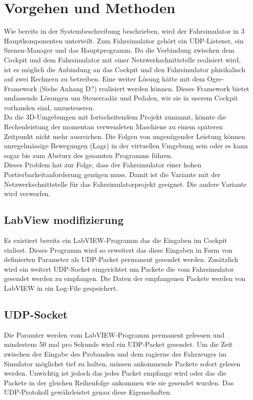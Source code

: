 \section{Vorgehen und Methoden}
Wie bereits in der Systembeschreibung beschrieben, wird der Fahrsimulator in 3 Hauptkomponenten unterteilt. Zum Fahrsimulator gehört ein UDP-Listener, ein Szenen-Manager und das Hauptprogramm. Da die Verbindung zwischen dem Cockpit und dem Fahrsimulator mit einer Netzwerkschnittstelle realisiert wird, ist es möglich die Anbindung an das Cockpit und den Fahrsimulator phisikalisch auf zwei Rechnern zu betreiben. Eine weiter Lösung hätte mit dem Ogre-Framework (Siehe Anhang D?) realisiert werden können. Dieses Framework bietet umfassende Lösungen um Steuerradär und Pedalen, wie sie in userem Cockpit vorhanden sind, anzusteueren.\\
Da die 3D-Umgebungen mit fortscheitendem Projekt zunimmt, könnte die Rechenleistung der momentan verwendeten Maschiene zu einem späteren Zeitpunkt nicht mehr ausreichen. Die Folgen von ungenügender Leistung können unregelmässige Bewegungen (Lags) in der virtuellen Umgebung sein oder es kann sogar bis zum Absturz des gesamten Programms führen. \\
Dieses Problem hat zur Folge, dass der Fahrsimulator einer hohen Portierbarkeitanforderung genügen muss. Damit ist die Variante mit der Netzwerkschnittstelle für das Fahrsimulatorprojekt geeignet. Die andere Variante wird verworfen.
\subsection{LabView modifizierung}
Es existiert bereits ein LabVIEW-Programm das die Eingaben im Cockpit einliest. Dieses Programm wird so erweitert das diese Eingaben in Form von definierten Parameter als UDP-Packet permanent gesendet werden. Zusätzlich wird ein weitert UDP-Socket eingerichtet um Packete die vom Fahrsimulator gesendet werden zu empfangen. Die Daten der empfangenen Packete werden von LabVIEW in ein Log-File gespeichert. 
\subsection{UDP-Socket}
Die Paramter werden vom LabVIEW-Programm permanent gelesuen und mindestens 50 mal pro Sekunde wird ein UDP-Packet gesendet. Um die Zeit zwischen der Eingabe des Probanden und dem ragierne des Fahrzeuges im Simulator möglichst tief zu halten, müssen ankommende Packete sofort gelesen werden. Unwichtig ist jedoch das jedes Packet empfange wird oder das die Packete in der gleichen Reihenfolge ankommen wie sie gesendet wurden. Das UDP-Protokoll gewährleistet genau diese Eigenschaften. \\

